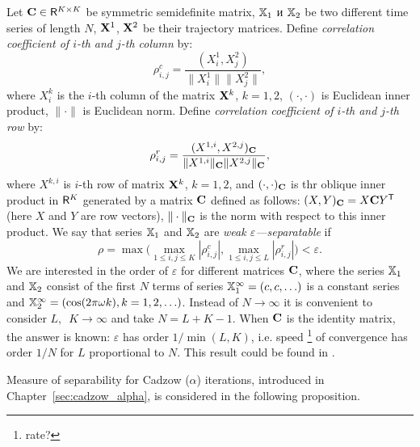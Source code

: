 \documentclass[sii]{ipart}
\begin{document}
Let $\mathbf{C} \in \mathsf{R}^{K \times K}$ be symmetric semidefinite matrix, $\mathbb{X}_1$ и $\mathbb{X}_2$ be two different time series of length $N$, $\mathbf{X}^1$, $\mathbf{X}^2$ be their trajectory matrices. Define \emph{correlation coefficient of $i$-th and $j$-th column} by:
\begin{equation}\label{col_corr}
\rho^c_{i,j} = \frac{(X^1_i, X^2_j)}{\|X^1_i\| \|X^2_j\|},
\end{equation}
where $X^k_i$ is the $i$-th column of the matrix $\mathbf{X}^k$, $k = 1, 2$, $(\cdot, \cdot)$ is Euclidean inner product, $\|\cdot\|$ is Euclidean norm. Define \emph{correlation coefficient of $i$-th and $j$-th row} by:
\begin{equation}\label{row_corr}
\rho^r_{i,j} = \frac{(X^{1,i}, X^{2,j})_\bfC}{\|X^{1,i}\|_\bfC \|X^{2,j}\|_\bfC},
\end{equation}
where $X^{k,i}$ is $i$-th row of matrix $\mathbf{X}^k$, $k = 1, 2$, and $(\cdot, \cdot)_{\mathbf{C}}$ is thr oblique inner product in $\mathsf{R}^K$ generated by a matrix $\mathbf{C}$ defined as follows: $(X, Y)_{\mathbf{C}} = X \mathbf{C} Y^{\mathsf{T}}$ (here $X$ and $Y$ are row vectors), $\| \cdot \|_{\mathbf{C}}$ is the norm with respect to this inner product. We say that series $\mathbb{X}_1$ and $\mathbb{X}_2$ are \emph{weak $\varepsilon$---separatable} if
\begin{equation}\label{weak_sep_eq}
\rho = \max\Big(\max_{1 \le i,j \le K}|\rho^c_{i,j}|, \max_{1 \le i,j \le L}|\rho^r_{i,j}|\Big) < \varepsilon.
\end{equation}
We are interested in the order of $\varepsilon$ for different matrices $\mathbf{C}$, where the series $\mathbb{X}_1$ and $\mathbb{X}_2$ consist of the first $N$ terms of series $\mathbb{X}_1^\infty = (c, c, \ldots)$ is a constant series and $\mathbb{X}_2^\infty = (\cos(2 \pi \omega k), k = 1, 2, \ldots)$. Instead of $N \to \infty$ it is convenient to consider $L,$~$K \to \infty$ and take $N = L + K - 1$. When $\mathbf{C}$ is the identity matrix, the answer is known: $\varepsilon$ has order $1/\min(L,K)$, i.e. speed \footnote{rate?} of convergence has order $1/N$ for $L$ proportional to $N$.
This result could be found in \cite[Chapter 6.1]{Golyandina.etal2001}. %

Measure of separability for Cadzow ($\alpha$) iterations, introduced in Chapter~\ref{sec:cadzow_alpha}, is considered in the following proposition.
\end{document}
